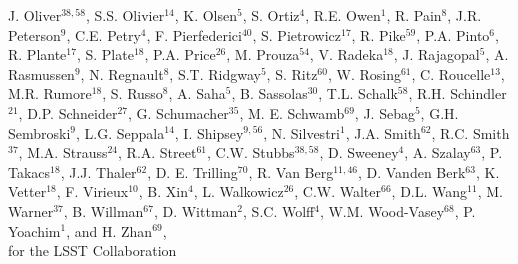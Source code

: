 {J. Oliver$^{38,58}$,
S.S. Olivier$^{14}$,
K. Olsen$^5$, 
S. Ortiz$^4$, 
R.E. Owen$^1$,
R. Pain$^{8}$,
J.R. Peterson$^{9}$,
C.E. Petry$^{4}$,  
F. Pierfederici$^{40}$,
S. Pietrowicz$^{17}$,
R. Pike$^{59}$,
P.A. Pinto$^{6}$,   
R. Plante$^{17}$,
S. Plate$^{18}$, 
P.A. Price$^{26}$,
M. Prouza$^{54}$,
V. Radeka$^{18}$, 
J. Rajagopal$^5$,   
A. Rasmussen$^9$,
N. Regnault$^8$,  
S.T. Ridgway$^5$, 
S. Ritz$^{60}$, 
W. Rosing$^{61}$,
C. Roucelle$^{13}$, 
M.R. Rumore$^{18}$, 
S. Russo$^8$,  
A. Saha$^{5}$,     
B. Sassolas$^{30}$, 
T.L. Schalk$^{58}$,     
R.H. Schindler$^{21}$,
D.P. Schneider$^{27}$,    
G. Schumacher$^{35}$,
M. E. Schwamb$^{69}$,
J. Sebag$^5$,
G.H. Sembroski$^9$, 
L.G. Seppala$^{14}$,
I. Shipsey$^{9,56}$,
N. Silvestri$^1$,
J.A. Smith$^{62}$,    
R.C. Smith$^{37}$,
M.A. Strauss$^{24}$,     
R.A. Street$^{61}$,     
C.W. Stubbs$^{38,58}$,
D. Sweeney$^4$,
A. Szalay$^{63}$,
P. Takacs$^{18}$, 
J.J. Thaler$^{62}$,
D. E. Trilling$^{70}$,
R. Van Berg$^{11,46}$, 
D. Vanden Berk$^{63}$,  
K. Vetter$^{18}$, 
F. Virieux$^{10}$, 
B. Xin$^4$,
L. Walkowicz$^{26}$,
C.W. Walter$^{66}$, 
D.L. Wang$^{11}$,
M. Warner$^{37}$,
B. Willman$^{67}$,
D. Wittman$^2$,
S.C. Wolff$^4$, 
W.M. Wood-Vasey$^{68}$,  
P. Yoachim$^1$,
and H. Zhan$^{69}$, \\
for the LSST Collaboration
}
\affil{}

